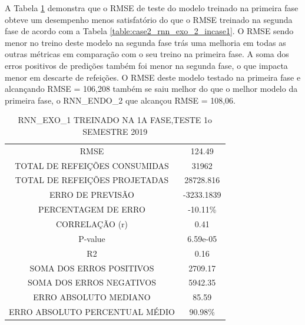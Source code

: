         A Tabela \ref{table:case1_rnn_exo_1} demonstra que o RMSE de teste do modelo treinado na primeira fase obteve um desempenho menos satisfatório do que o RMSE treinado na segunda fase de acordo com a Tabela \ref{table:case2_rnn_exo_2_incase1}. O RMSE sendo menor no treino deste modelo na segunda fase trás uma melhoria em todas as outras métricas em comparação com o seu treino na primeira fase.
        A soma dos erros positivos de predições também foi menor na segunda fase, o que impacta menor em descarte de refeições.
        O RMSE deste modelo testado na primeira fase e alcançando RMSE = 106,208 também se saiu melhor do que o melhor modelo da primeira fase, o RNN\_ENDO\_2 que alcançou RMSE = 108,06.
        
        
        
        
        \begin{table}[!ht]
            \centering
            \caption{RNN\_EXO\_1 TREINADO NA 1A FASE,TESTE 1o SEMESTRE 2019}
            \label{table:case1_rnn_exo_1}
                \begin{tabular}{c|c}
                \rowcolor{gray!50}
                \hline
            \multicolumn{2}{c}{RNN\_EXO\_1 TREINADO NA 1A FASE,TESTE 1o SEMESTRE 2019} \\
            \hline
            RMSE & 124.49\\
            TOTAL DE REFEIÇÕES CONSUMIDAS & 31962 \\
            TOTAL DE REFEIÇÕES PROJETADAS & 28728.816  \\
            ERRO DE PREVISÃO & -3233.1839 \\
            PERCENTAGEM DE ERRO & -10.11\%  \\
            CORRELAÇÃO (r) & 0.41 \\ 
            P-value & 6.59e-05\\ 
            R2 & 0.16\\
            SOMA DOS ERROS POSITIVOS & 2709.17\\
            SOMA DOS ERROS NEGATIVOS & 5942.35\\
            ERRO ABSOLUTO MEDIANO & 85.59\\
            ERRO ABSOLUTO PERCENTUAL MÉDIO & 90.98\% \\ \hline \end{tabular} \end{table}
            
      
      
